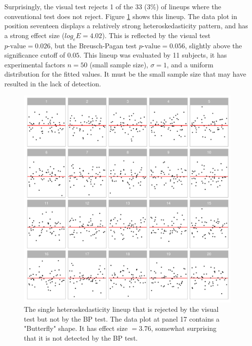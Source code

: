 \documentclass[]{interact}
\theoremstyle{plain}%
\theoremstyle{definition}
\theoremstyle{remark}
\begin{document}
Surprisingly, the visual test rejects 1 of the 33 (3\%) of lineups where
the conventional test does not reject. Figure \ref{fig:heter-example}
shows this lineup. The data plot in position seventeen displays a
relatively strong heteroskedasticity pattern, and has a strong effect
size (\(log_e E=4.02\)). This is reflected by the visual test
\(p\text{-value} = 0.026\), but the Breusch-Pagan test
\(p\text{-value} = 0.056\), slightly above the significance cutoff of
\(0.05\). This lineup was evaluated by 11 subjects, it has experimental
factors \(n=50\) (small sample size), \(\sigma=1\), and a uniform
distribution for the fitted values. It must be the small sample size
that may have resulted in the lack of detection.

\begin{figure}

{\centering \includegraphics[width=1\linewidth]{paper_comparison_files/figure-latex/heter-example-1} 

}

\caption{The single heteroskedasticity lineup that is rejected by the visual test but not by the BP test. The data plot at panel 17 contains a "Butterfly" shape. It has effect size $ = 3.76$, somewhat surprising that it is not detected by the BP test.}\label{fig:heter-example}
\end{figure}
\end{document}
